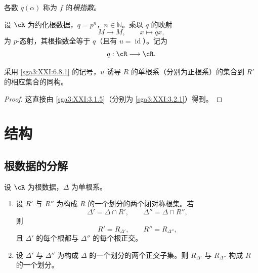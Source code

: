 \begin{definition}\label{sga3:XXI:6.8.5}
各数 \(q(\alpha)\) 称为 \(f\) 的\emph{根指数}。
\end{definition}

\begin{example}\label{sga3:XXI:6.8.6}
设 \(\cR\) 为约化根数据，\(q=p^n\)，\(n\in\mathbb N\)。乘以 \(q\) 的映射
\[
 M\longrightarrow M,\qquad x\longmapsto qx,
\]
为 \(p\)-态射，其根指数全等于 \(q\)（且有 \(u=\operatorname{id}\)）。记为
\[
 q:\cR\longrightarrow\cR.
\]
\end{example}

\begin{proposition}\label{sga3:XXI:6.8.7}
采用 \ref{sga3:XXI:6.8.1} 的记号，\(u\) 诱导 \(R\) 的单根系（分别为正根系）的集合到 \(R'\) 的相应集合的同构。
\end{proposition}

\begin{proof}
这直接由 \ref{sga3:XXI:3.1.5}（分别为 \ref{sga3:XXI:3.2.1}）得到。
\end{proof}

\section{结构}\label{sga3:XXI:7}

\subsection{根数据的分解}\label{sga3:XXI:7.1}

\begin{proposition}\label{sga3:XXI:7.1.1}
设 \(\cR\) 为根数据，\(\Delta\) 为单根系。
\begin{enumerate}
\item[\SGAInlineRefTarget{sga3:XXI:7.1.1:item:i}(i)] 设 \(R'\) 与 \(R''\) 为构成 \(R\) 的一个划分的两个闭对称根集。若
  \[
   \Delta'=\Delta\cap R',
   \qquad
   \Delta''=\Delta\cap R'',
  \]
  则
  \[
   R'=R_{\Delta'},
   \qquad
   R''=R_{\Delta''},
  \]
  且 \(\Delta'\) 的每个根都与 \(\Delta''\) 的每个根正交。
\item[\SGAInlineRefTarget{sga3:XXI:7.1.1:item:ii}(ii)] 设 \(\Delta'\) 与 \(\Delta''\) 为构成 \(\Delta\) 的一个划分的两个正交子集。则 \(R_{\Delta'}\) 与 \(R_{\Delta''}\) 构成 \(R\) 的一个划分。
\end{enumerate}
\end{proposition}

